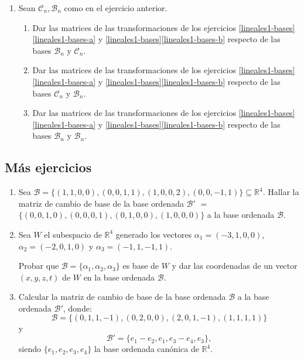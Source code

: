 \begin{enumerate}[topsep=6pt, itemsep=.4cm]
\item \label{basesRn} Sean $\mathcal{C}_n, \mathcal{B}_n$ como en el ejercicio anterior.
\begin{enumerate}
    \item Dar las matrices de las transformaciones de los ejercicios  \ref{lineales1-bases}\ref{lineales1-bases-a}  y \ref{lineales1-bases}\ref{lineales1-bases-b} respecto de las bases $\mathcal{B}_n$ y
    $\mathcal{C}_n$.
    \item Dar las matrices de las transformaciones  de los ejercicios  \ref{lineales1-bases}\ref{lineales1-bases-a}  y \ref{lineales1-bases}\ref{lineales1-bases-b} respecto de las bases $\mathcal{C}_n$ y
    $\mathcal{B}_n$.
    \item Dar las matrices de las transformaciones  de los ejercicios  \ref{lineales1-bases}\ref{lineales1-bases-a}  y \ref{lineales1-bases}\ref{lineales1-bases-b} respecto de las bases $\mathcal{B}_n$ y
    $\mathcal{B}_n$.
\end{enumerate}




\end{enumerate}

\subsection*{Más ejercicios}

\begin{enumerate}[resume, topsep=5pt,itemsep=.4cm]

\item Sea $\mathcal{B}=
\{ (1, 1, 0, 0), (0,0,1,1), (1, 0, 0, 2), (0, 0, -1, 1)\} \subseteq \mathbb R^4$.
Ha\-llar la matriz de cambio de base de la base ordenada $\mathcal B'$ $=$ $\{(0, 0, 1, 0), (0, 0, 0, 1), (0, 1, 0, 0), (1, 0, 0, 0)\}$ a la base ordenada $\mathcal{B}$.



\item  Sea $W$ el subespacio de $\mathbb R^4$ generado los vectores $\alpha_1 = (-3, 1, 0, 0)$, $\alpha_2 = (-2, 0, 1, 0)$ y $\alpha_3 = (-1,1,-1,1)$.

Probar que $\mathcal B = \{\alpha_1, \alpha_2, \alpha_3\}$ es  base de $W$ y dar las coordenadas de un vector $(x, y, z, t)$ de $W$ en la base ordenada $\mathcal B$.


\item Calcular la matriz de cambio de base de la base ordenada $\mathcal B$ a la base ordenada $\mathcal B'$, donde: $$\mathcal B  = \{ (0, 1, 1, -1), (0, 2, 0, 0), (2, 0, 1,-1), (1, 1, 1, 1)\}$$ y $$\mathcal B'  = \{ e_1-e_2, e_1, e_3-e_4,
e_3\},$$ siendo $\{ e_1, e_2, e_3, e_4\}$ la base ordenada canónica de $\mathbb R^4$.

\end{enumerate}


